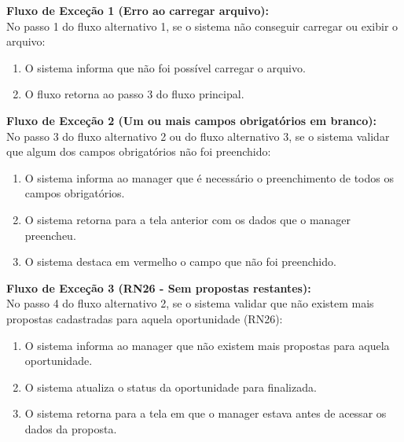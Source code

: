 \noindent\textbf{Fluxo de Exceção 1 (Erro ao carregar arquivo):}\\
No passo 1 do fluxo alternativo 1, se o sistema não conseguir carregar ou exibir o arquivo:
\begin{enumerate}[noitemsep, topsep=-5pt, parsep=0pt]
    \item O sistema informa que não foi possível carregar o arquivo.
    \item O fluxo retorna ao passo 3 do fluxo principal.
\end{enumerate}

\noindent\textbf{Fluxo de Exceção 2 (Um ou mais campos obrigatórios em branco):}\\
No passo 3 do fluxo alternativo 2 ou do fluxo alternativo 3, se o sistema validar que algum dos campos obrigatórios não foi preenchido:
\begin{enumerate}[noitemsep, topsep=-5pt, parsep=0pt]
    \item O sistema informa ao manager que é necessário o preenchimento de todos os campos obrigatórios.
    \item O sistema retorna para a tela anterior com os dados que o manager preencheu.
    \item O sistema destaca em vermelho o campo que não foi preenchido.
\end{enumerate}

\noindent\textbf{Fluxo de Exceção 3 (RN26 - Sem propostas restantes):}\\
No passo 4 do fluxo alternativo 2, se o sistema validar que não existem mais propostas cadastradas para aquela oportunidade (RN26):
\begin{enumerate}[noitemsep, topsep=-5pt, parsep=0pt]
    \item O sistema informa ao manager que não existem mais propostas para aquela oportunidade.
    \item O sistema atualiza o status da oportunidade para finalizada.
    \item O sistema retorna para a tela em que o manager estava antes de acessar os dados da proposta.
\end{enumerate}


